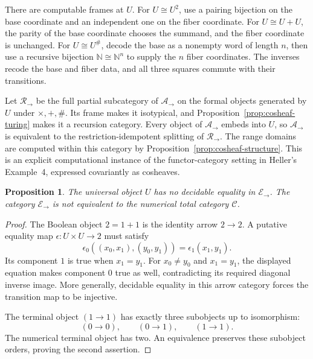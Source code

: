 \documentclass[11pt]{article}
\newtheorem{proposition}[theorem]{Proposition}
\theoremstyle{definition}\newtheorem{definition}[theorem]{Definition}
\theoremstyle{remark}\newtheorem{remark}[theorem]{Remark}
\newcommand{\A}{\mathscr A}
\newcommand{\E}{\mathscr E}
\newcommand{\N}{\mathbb N}
\begin{document}
There are computable frames at \(U\). For \(U\cong U^2\), use a
pairing bijection on the base coordinate and an independent one
on the fiber coordinate. For \(U\cong U+U\), the parity of the
base coordinate chooses the summand, and the fiber coordinate is
unchanged. For \(U\cong U^\#\), decode the base as a nonempty
word of length \(n\), then use a recursive bijection
\(\N\cong\N^n\) to supply the \(n\) fiber coordinates. The
inverses recode the base and fiber data, and all three squares
commute with their transitions.

Let \(\mathscr R_\to\) be the full partial subcategory of
\(\A_\to\) on the formal objects generated by \(U\) under
\(\times,+,\#\). Its frame makes it isotypical, and
Proposition~\ref{prop:cosheaf-turing} makes it a recursion category.
Every object of \(\A_\to\) embeds into \(U\), so
\(\A_\to\) is equivalent to the restriction-idempotent splitting
of \(\mathscr R_\to\).
The range domains are computed within this category by
Proposition~\ref{prop:cosheaf-structure}. This is an explicit
computational instance of the functor-category setting in
Heller's Example~4, expressed covariantly as cosheaves.

\begin{proposition}\label{prop:no-decidable-equality}
The universal object \(U\) has no decidable equality in \(\E_\to\).
The category \(\E_\to\) is not equivalent to the numerical total
category \(\mathscr C\).
\end{proposition}
\begin{proof}
The Boolean object \(2=1+1\) is the identity arrow \(2\to2\).
A putative equality map \(\epsilon:U\times U\to2\) must satisfy
\[
 \epsilon_0((x_0,x_1),(y_0,y_1))=\epsilon_1(x_1,y_1).
\]
Its component \(1\) is true when \(x_1=y_1\). For \(x_0\ne y_0\)
and \(x_1=y_1\), the displayed equation makes component \(0\)
true as well, contradicting its required diagonal inverse image.
More generally, decidable equality in this arrow category forces
the transition map to be injective.

The terminal object \((1\to1)\) has exactly three subobjects up
to isomorphism:
\[
 (0\to0),\qquad(0\to1),\qquad(1\to1).
\]
The numerical terminal object has two. An equivalence preserves
these subobject orders, proving the second assertion.
\end{proof}
\end{document}

